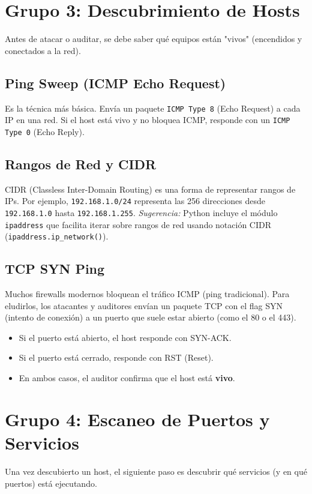 \documentclass[12pt,a4paper]{article}
\begin{document}
\section{Grupo 3: Descubrimiento de Hosts}
Antes de atacar o auditar, se debe saber qué equipos están "vivos" (encendidos y conectados a la red).

\subsection{Ping Sweep (ICMP Echo Request)}
Es la técnica más básica. Envía un paquete \texttt{ICMP Type 8} (Echo Request) a cada IP en una red. Si el host está vivo y no bloquea ICMP, responde con un \texttt{ICMP Type 0} (Echo Reply).

\subsection{Rangos de Red y CIDR}
CIDR (Classless Inter-Domain Routing) es una forma de representar rangos de IPs. Por ejemplo, \texttt{192.168.1.0/24} representa las 256 direcciones desde \texttt{192.168.1.0} hasta \texttt{192.168.1.255}.
\textit{Sugerencia:} Python incluye el módulo \texttt{ipaddress} que facilita iterar sobre rangos de red usando notación CIDR (\texttt{ipaddress.ip\_network()}).

\subsection{TCP SYN Ping}
Muchos firewalls modernos bloquean el tráfico ICMP (ping tradicional). Para eludirlos, los atacantes y auditores envían un paquete TCP con el flag SYN (intento de conexión) a un puerto que suele estar abierto (como el 80 o el 443).
\begin{itemize}
    \item Si el puerto está abierto, el host responde con SYN-ACK.
    \item Si el puerto está cerrado, responde con RST (Reset).
    \item En ambos casos, el auditor confirma que el host está \textbf{vivo}.
\end{itemize}

\section{Grupo 4: Escaneo de Puertos y Servicios}
Una vez descubierto un host, el siguiente paso es descubrir qué servicios (y en qué puertos) está ejecutando.
\end{document}
